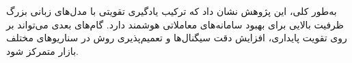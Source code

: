 \documentclass[12pt, a4paper]{report}
\begin{document}
به‌طور کلی، این پژوهش نشان داد که ترکیب یادگیری تقویتی با مدل‌های زبانی بزرگ ظرفیت بالایی برای بهبود سامانه‌های معاملاتی هوشمند دارد. 
گام‌های بعدی می‌تواند بر روی تقویت پایداری، افزایش دقت سیگنال‌ها و تعمیم‌پذیری روش در سناریوهای مختلف بازار متمرکز شود.  

\begin{latin}


\end{latin}
\end{document}
